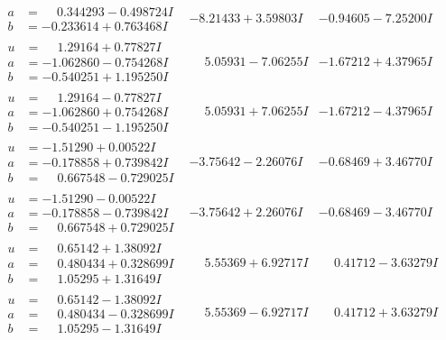 \documentclass[1p]{elsarticle_modified}
\theoremstyle{definition}
\begin{document}
$$\begin{array}{c|c|c}
\begin{aligned}
a &= \phantom{-}0.344293 - 0.498724 I \\
b &= -0.233614 + 0.763468 I\end{aligned}
 & -8.21433 + 3.59803 I & -0.94605 - 7.25200 I \\ \hline\begin{aligned}
u &= \phantom{-}1.29164 + 0.77827 I \\
a &= -1.062860 - 0.754268 I \\
b &= -0.540251 + 1.195250 I\end{aligned}
 & \phantom{-}5.05931 - 7.06255 I & -1.67212 + 4.37965 I \\ \hline\begin{aligned}
u &= \phantom{-}1.29164 - 0.77827 I \\
a &= -1.062860 + 0.754268 I \\
b &= -0.540251 - 1.195250 I\end{aligned}
 & \phantom{-}5.05931 + 7.06255 I & -1.67212 - 4.37965 I \\ \hline\begin{aligned}
u &= -1.51290 + 0.00522 I \\
a &= -0.178858 + 0.739842 I \\
b &= \phantom{-}0.667548 - 0.729025 I\end{aligned}
 & -3.75642 - 2.26076 I & -0.68469 + 3.46770 I \\ \hline\begin{aligned}
u &= -1.51290 - 0.00522 I \\
a &= -0.178858 - 0.739842 I \\
b &= \phantom{-}0.667548 + 0.729025 I\end{aligned}
 & -3.75642 + 2.26076 I & -0.68469 - 3.46770 I \\ \hline\begin{aligned}
u &= \phantom{-}0.65142 + 1.38092 I \\
a &= \phantom{-}0.480434 + 0.328699 I \\
b &= \phantom{-}1.05295 + 1.31649 I\end{aligned}
 & \phantom{-}5.55369 + 6.92717 I & \phantom{-}0.41712 - 3.63279 I \\ \hline\begin{aligned}
u &= \phantom{-}0.65142 - 1.38092 I \\
a &= \phantom{-}0.480434 - 0.328699 I \\
b &= \phantom{-}1.05295 - 1.31649 I\end{aligned}
 & \phantom{-}5.55369 - 6.92717 I & \phantom{-}0.41712 + 3.63279 I \\ \hline\begin{aligned}

\end{aligned}
\end{array}$$
\end{document}
